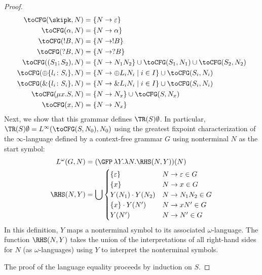 \begin{proof}
  \begin{align*}
    \toCFG (\skipk, N) & = \{ N \to \varepsilon \} \\
    \toCFG (\alpha, N) & = \{ N \to \alpha \} \\
    \toCFG (!B, N) & = \{ N \to !B \} \\
    \toCFG (?B, N) & = \{ N \to ?B\} \\
    \toCFG ((S_1; S_2), N) & = \{ N \to N_1N_2 \} \cup \toCFG (S_1, N_1) \cup \toCFG (S_2, N_2) \\
    \toCFG (\oplus\{l_i\colon S_i\}, N) & = \{ N \to {\oplus L_i} N_i \mid i\in I \} \cup \toCFG (S_i, N_i) \\
    \toCFG (\&\{l_i\colon S_i\}, N) & = \{ N \to {\& L_i} N_i \mid i\in I \} \cup \toCFG (S_i, N_i) \\
    \toCFG (\mu x.S, N) &= \{ N \to N_x \} \cup \toCFG (S, N_x) \\
    \toCFG (x, N) &= \{ N \to N_x \} \\
  \end{align*}
  Next, we show that this grammar defines $\TR (S)\emptyset$.
  In particular, $\TR (S)\emptyset = L^\infty (\toCFG (S, N_0), N_0)$
  using the greatest fixpoint characterization of the
  $\infty$-language defined by a context-free grammar $G$ using
  nonterminal $N$ as the start symbol:
  \begin{align*}
    L^\omega (G, N) & = (\GFP\, \lambda Y. \lambda N. \RHS (N, Y)) (N) \\
    \RHS (N, Y) &= \bigcup
                          \begin{cases}
                            \{ \varepsilon \} & N \to \varepsilon \in G \\
                            \{ x \} & N \to x \in G\\
                            Y (N_1) \cdot Y (N_2) & N \to N_1N_2 \in G \\
                            \{ x \} \cdot Y (N') & N \to x N' \in G \\
                            Y (N') & N \to N' \in G
                          \end{cases}
  \end{align*}
  In this definition, $Y$ maps a nonterminal symbol to its associated
  $\omega$-language. The function $\RHS (N, Y)$ takes the union of the
  interpretations of all right-hand sides for $N$ (as
  $\omega$-languages) using $Y$ to interpret the nonterminal symbols.

  The proof of the language equality proceeds by induction on $S$.


\end{proof}
